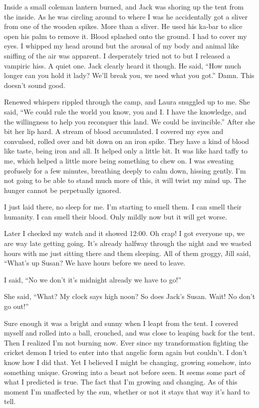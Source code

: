Inside a small coleman lantern burned, and Jack was shoring up the tent from the inside. As he was circling around to where I was he accidentally got a sliver from one of the wooden spikes. More than a sliver. He used his ka-bar to slice open his palm to remove it. Blood splashed onto the ground. I had to cover my eyes. I whipped my head around but the arousal of my body and animal like sniffing of the air was apparent. I desperately tried not to but I released a vampiric hiss. A quiet one. Jack clearly heard it though. He said, ``How much longer can you hold it lady? We'll break you, we need what you got.'' Damn. This doesn't sound good.

Renewed whispers rippled through the camp, and Laura snuggled up to me. She said, ``We could rule the world you know, you and I. I have the knowledge, and the willingness to help you reconquer this land. We could be invincible.'' After she bit her lip hard. A stream of blood accumulated. I covered my eyes and convulsed, rolled over and bit down on an iron spike. They have a kind of blood like taste, being iron and all. It helped only a little bit. It was like hard taffy to me, which helped a little more being something to chew on. I was sweating profusely for a few minutes, breathing deeply to calm down, hissing gently. I'm not going to be able to stand much more of this, it will twist my mind up. The hunger cannot be perpetually ignored.

I just laid there, no sleep for me. I'm starting to smell them. I can smell their humanity. I can smell their blood. Only mildly now but it will get worse.

Later I checked my watch and it showed 12:00. Oh crap! I got everyone up, we are way late getting going. It's already halfway through the night and we wasted hours with me just sitting there and them sleeping. All of them groggy, Jill said, ``What's up Susan? We have hours before we need to leave.

I said, ``No we don't it's midnight already we have to go!''

She said, ``What? My clock says high noon? So does Jack's Susan. Wait! No don't go out!''

Sure enough it was a bright and sunny when I leapt from the tent. I covered myself and rolled into a ball, crouched, and was close to leaping back for the tent. Then I realized I'm not burning now. Ever since my transformation fighting the cricket demon I tried to enter into that angelic form again but couldn't. I don't know how I did that. Yet I believed I might be changing, growing somehow, into something unique. Growing into a beast not before seen. It seems some part of what I predicted is true. The fact that I'm growing and changing. As of this moment I'm unaffected by the sun, whether or not it stays that way it's hard to tell.


